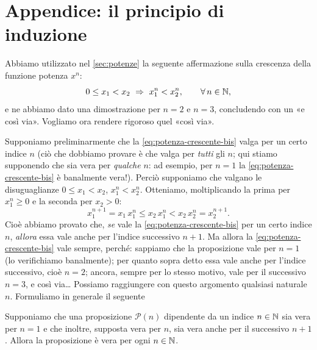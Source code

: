 \section{Appendice: il principio di induzione}
\label{sec:induzione}

Abbiamo utilizzato nel \cref{sec:potenze} la seguente affermazione sulla crescenza
della funzione potenza $x^{n}$:
\begin{equation}\label{eq:potenza-crescente-bis}
  0\le x_{1}<x_{2} \ \Rightarrow\ x_{1}^{n}<x_{2}^{n}, \qquad\forall\, n\in\mathbb{N},
\end{equation}
e ne abbiamo dato una dimostrazione per $n=2$ e $n=3$, concludendo con un «e così
via». Vogliamo ora rendere rigoroso quel «così via».

Supponiamo preliminarmente che la \eqref{eq:potenza-crescente-bis} valga per un certo
indice $n$ (ciò che dobbiamo provare è che valga per \emph{tutti} gli $n$; qui stiamo
supponendo che sia vera per \emph{qualche} $n$: ad esempio, per $n=1$ la
\eqref{eq:potenza-crescente-bis} è banalmente vera!). Perciò supponiamo che valgano le
disuguaglianze $0\le x_{1}<x_{2}$, $x_{1}^{n}<x_{2}^{n}$. Otteniamo, moltiplicando la
prima per $x_{1}^{n}\ge0$ e la seconda per $x_{2}>0$:
\begin{equation}\label{eq:passo-potenza}
  x_{1}^{n+1}=x_{1}\,x_{1}^{n}\le x_{2}\,x_{1}^{n}<x_{2}\,x_{2}^{n}=x_{2}^{n+1}.
\end{equation}
Cioè abbiamo provato che, \emph{se} vale la \eqref{eq:potenza-crescente-bis} per un
certo indice $n$, \emph{allora} essa vale anche per l'indice successivo $n+1$. Ma allora
la \eqref{eq:potenza-crescente-bis} vale sempre, perché: sappiamo che la proposizione
vale per $n=1$ (lo verifichiamo banalmente); per quanto sopra detto essa vale anche per
l'indice successivo, cioè $n=2$; ancora, sempre per lo stesso motivo, vale per il
successivo $n=3$, e così via\ldots{} Possiamo raggiungere con questo argomento
qualsiasi naturale $n$. Formuliamo in generale il seguente

\begin{teorema}\label{teo:induzione}
Supponiamo che una proposizione $\mathcal{P}(n)$ dipendente da un indice $n\in\mathbb{N}$ sia
vera per $n=1$ e che inoltre, supposta vera per $n$, sia vera anche per il successivo
$n+1$. Allora la proposizione è vera per ogni $n\in\mathbb{N}$.
\end{teorema}

